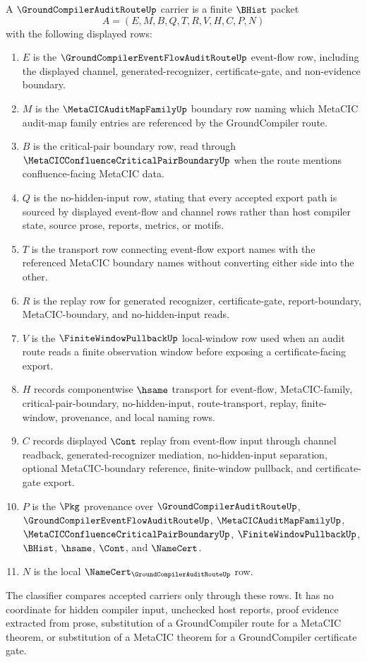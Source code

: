 \begin{definition}
\label{def:groundcompiler-audit-route-carrier}
A $\GroundCompilerAuditRouteUp$ carrier is a finite $\BHist$ packet
$$
A=(E,M,B,Q,T,R,V,H,C,P,N)
$$
with the following displayed rows:
\begin{enumerate}
\item $E$ is the $\GroundCompilerEventFlowAuditRouteUp$ event-flow row, including the displayed channel, generated-recognizer, certificate-gate, and non-evidence boundary.
\item $M$ is the $\MetaCICAuditMapFamilyUp$ boundary row naming which MetaCIC audit-map family entries are referenced by the GroundCompiler route.
\item $B$ is the critical-pair boundary row, read through $\MetaCICConfluenceCriticalPairBoundaryUp$ when the route mentions confluence-facing MetaCIC data.
\item $Q$ is the no-hidden-input row, stating that every accepted export path is sourced by displayed event-flow and channel rows rather than host compiler state, source prose, reports, metrics, or motifs.
\item $T$ is the transport row connecting event-flow export names with the referenced MetaCIC boundary names without converting either side into the other.
\item $R$ is the replay row for generated recognizer, certificate-gate, report-boundary, MetaCIC-boundary, and no-hidden-input reads.
\item $V$ is the $\FiniteWindowPullbackUp$ local-window row used when an audit route reads a finite observation window before exposing a certificate-facing export.
\item $H$ records componentwise $\hsame$ transport for event-flow, MetaCIC-family, critical-pair-boundary, no-hidden-input, route-transport, replay, finite-window, provenance, and local naming rows.
\item $C$ records displayed $\Cont$ replay from event-flow input through channel readback, generated-recognizer mediation, no-hidden-input separation, optional MetaCIC-boundary reference, finite-window pullback, and certificate-gate export.
\item $P$ is the $\Pkg$ provenance over $\GroundCompilerAuditRouteUp$, $\GroundCompilerEventFlowAuditRouteUp$, $\MetaCICAuditMapFamilyUp$, $\MetaCICConfluenceCriticalPairBoundaryUp$, $\FiniteWindowPullbackUp$, $\BHist$, $\hsame$, $\Cont$, and $\NameCert$.
\item $N$ is the local $\NameCert_{\GroundCompilerAuditRouteUp}$ row.
\end{enumerate}
The classifier compares accepted carriers only through these rows. It has no coordinate for hidden compiler input, unchecked host reports, proof evidence extracted from prose, substitution of a GroundCompiler route for a MetaCIC theorem, or substitution of a MetaCIC theorem for a GroundCompiler certificate gate.
\end{definition}

